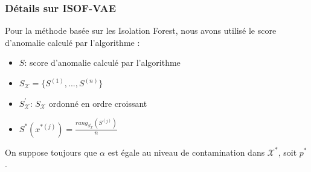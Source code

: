 \documentclass{beamer}
\begin{document}
	
	\begin{frame}
		\frametitle{Détails sur ISOF-VAE}
		
		Pour la méthode basée sur les Isolation Forest, nous avons utilisé le score d'anomalie calculé par l'algorithme :
		
		\begin{itemize}
			\item $S$: score d'anomalie calculé par l'algorithme
			\item $S_{\mathcal{X}} = \{S^{(1)}, ..., S^{(n)}\}$
			\item $S^{'}_{\mathcal{X}}$: $S_{\mathcal{X}}$ ordonné en ordre croissant
			\item $S^*(x^{*(j)}) = \frac{rang_{S^{'}_{\mathcal{X}}}(S^{(j)})}{n}$
		\end{itemize}
		
		On suppose toujours que $\alpha$ est égale au niveau de contamination dans $\mathcal{X^*}$, soit $p^*$.
		
	\end{frame}
\end{document}
